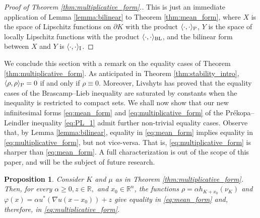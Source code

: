 \documentclass[a4paper, 11pt]{article}
\newcommand{\R}{\mathbb{R}}
\newtheorem{proposition}[theorem]{Proposition}
\theoremstyle{definition}
\begin{document}
\begin{proof}[Proof of Theorem \ref{thm:multiplicative_form}.] This is just an immediate application of Lemma \ref{lemma:bilinear} to Theorem \ref{thm:mean_form}, where $X$ is the space of Lipschitz functions on $\partial K$ with the product $\langle\cdot,\cdot\rangle_{\rm P}$, $Y$ is the space of locally Lipschitz functions with the product $\langle \cdot, \cdot \rangle_{\rm BL}$, and the bilinear form between $X$ and $Y$ is $\langle\cdot,\cdot\rangle_{\rm I}$.
\end{proof}

We conclude this section with a remark on the equality cases of Theorem \ref{thm:multiplicative_form}. As anticipated in Theorem \ref{thm:stability_intro}, $\langle \rho, \rho \rangle_{\rm P}=0$ if and only if $\rho\equiv 0$. Moreover, Livshyts \cite{GalynaStability} has proved that the equality cases of the Brascamp--Lieb inequality are saturated by constants when the inequality is restricted to compact sets. We shall now show that our new infinitesimal forms \eqref{eq:mean_form} and \eqref{eq:multiplicative_form} of the Pr\'ekopa--Leindler inequality \eqref{eq:PL_1} admit further non-trivial equality cases. Observe that, by Lemma \ref{lemma:bilinear}, equality in \eqref{eq:mean_form} implies equality in \eqref{eq:multiplicative_form}, but not vice-versa. That is, \eqref{eq:multiplicative_form} is sharper than \eqref{eq:mean_form}. A full characterization is out of the scope of this paper, and will be the subject of future research.
\begin{proposition}\label{prop:equality}
    Consider $K$ and $\mu$ as in Theorem \ref{thm:multiplicative_form}. Then, for every $\alpha \geq 0, z \in \R,$ and $x_0 \in \R^n$, the functions $\rho=\alpha h_{K+x_0}(\nu_K)$ and $\varphi(x)=\alpha u^*(\nabla u(x-x_0))+z$ give equality in \eqref{eq:mean_form} and, therefore, in \eqref{eq:multiplicative_form}. 
\end{proposition}
\end{document}
